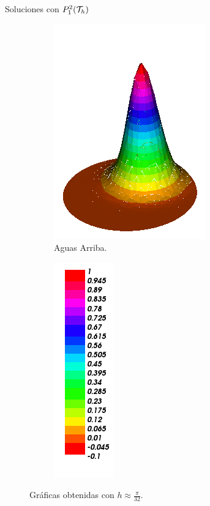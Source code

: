 \begin{frame}{Soluciones con $\relax{P}_1^2(\mathcal{T}_h)$}
\begin{figure}[h!]
\begin{subfigure}[b]{0.27\textwidth}
				\includegraphics[scale=0.22]{img/Conveccion_Reaccion/Recortes/steady_convect_react_approx_UPW_n_64.png}
				\caption{Aguas Arriba.}
			\end{subfigure}
			\begin{subfigure}[b]{0.15\textwidth}
				\centering
				\includegraphics[scale=0.22]{img/Conveccion_Reaccion/Recortes/steady_convect_react_values.png}
			\end{subfigure}
			\caption{Gráficas obtenidas con $h\approx\frac{\pi}{32}$.}
		\end{figure}
		\end{frame}
		
